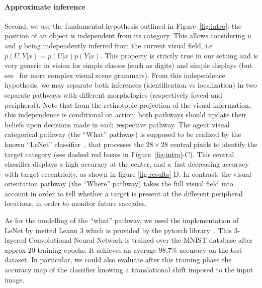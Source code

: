 \paragraph{Approximate inference}
Second, we %
use the fundamental hypothesis outlined in Figure~\ref{fig:intro}: the position of an object is independent from its category.  This allows considering $u$ and $y$ being independently inferred from the current visual field, i.e $p(U,Y|x) = p(U|x) p(Y|x)$. This property is strictly true in our setting and is very generic in vision for simple classes (such as digits) and simple displays (but see~\citep{Vo12} for more complex visual scene grammars). 
From this independence hypothesis, we may separate both inferences (identification vs localization) in two separate pathways with different morphologies (respectively foveal and peripheral). Note that from the retinotopic projection of the visual information, this independence is conditional on action: both pathways should update their beliefs upon decisions made in each respective pathway.
The agent visual categorical pathway (the ``What'' pathway) is supposed to be realized by the known ``LeNet'' classifier~\citep{Lecun1998}, that processes the $28 \times 28$ central pixels to identify the target category (see dashed red boxes in  Figure~\ref{fig:intro}-C). This central classifier displays a high accuracy at the center, and a fast decreasing accuracy with target eccentricity, as shown in figure \ref{fig:results}-D. In contrast, the visual orientation pathway (the ``Where'' pathway) takes the full visual field into account in order to tell whether a target is present at the different peripheral locations, in order to monitor future saccades.

As for the modelling of the ``what'' pathway, we used the implementation of LeNet by invited Leann 3 which is provided by the pytorch library~\citep{Paszke17}. This 3-layered Convolutional Neural Network is trained over the MNIST database after approx $20$ training epochs. It achieves an average $98.7\%$ accuracy on the test dataset. In particular, we could also evaluate after this  training phase the accuracy map of the classifier knowing a translational shift imposed to the input image. 



